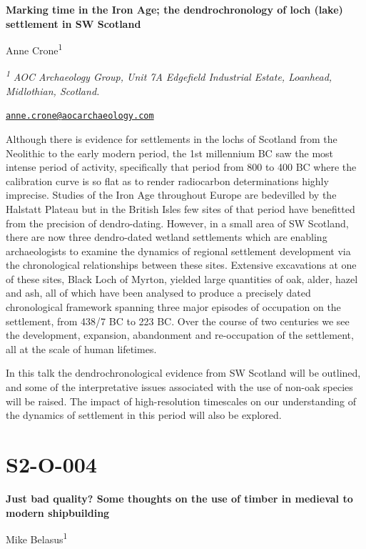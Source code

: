 \documentclass[
]{book}
\begin{document}
\textbf{Marking time in the Iron Age; the dendrochronology of loch (lake) settlement in SW Scotland}

Anne Crone\textsuperscript{1}

\textsuperscript{\emph{1}} \emph{AOC Archaeology Group, Unit 7A Edgefield Industrial Estate, Loanhead, Midlothian, Scotland.}

\href{mailto:anne.crone@aocarchaeology.com}{\nolinkurl{anne.crone@aocarchaeology.com}}

Although there is evidence for settlements in the lochs of Scotland from the Neolithic to the early modern period, the 1st millennium BC saw the most intense period of activity, specifically that period from 800 to 400 BC where the calibration curve is so flat as to render radiocarbon determinations highly imprecise. Studies of the Iron Age throughout Europe are bedevilled by the Halstatt Plateau but in the British Isles few sites of that period have benefitted from the precision of dendro-dating. However, in a small area of SW Scotland, there are now three dendro-dated wetland settlements which are enabling archaeologists to examine the dynamics of regional settlement development via the chronological relationships between these sites. Extensive excavations at one of these sites, Black Loch of Myrton, yielded large quantities of oak, alder, hazel and ash, all of which have been analysed to produce a precisely dated chronological framework spanning three major episodes of occupation on the settlement, from 438/7 BC to 223 BC. Over the course of two centuries we see the development, expansion, abandonment and re-occupation of the settlement, all at the scale of human lifetimes.

In this talk the dendrochronological evidence from SW Scotland will be outlined, and some of the interpretative issues associated with the use of non-oak species will be raised. The impact of high-resolution timescales on our understanding of the dynamics of settlement in this period will also be explored.

\hypertarget{s2-o-004}{%
\section*{S2-O-004}\label{s2-o-004}}

\textbf{Just bad quality? Some thoughts on the use of timber in medieval to modern shipbuilding}

Mike Belasus\textsuperscript{1}
\end{document}
